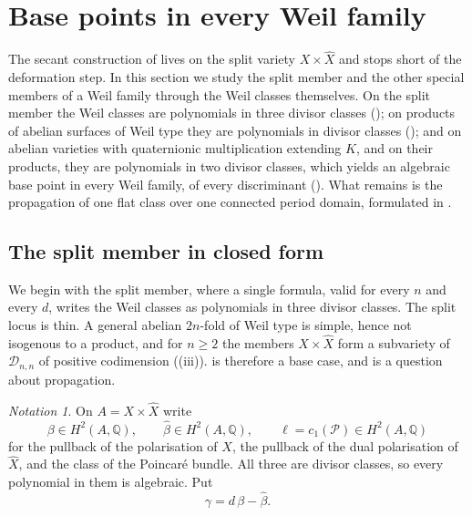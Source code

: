\documentclass[11pt,reqno]{amsart}
\theoremstyle{plain}
\theoremstyle{definition}
\theoremstyle{remark}
\newtheorem{notation}[theorem]{Notation}
\newcommand{\QQ}{\mathbb{Q}}
\newcommand{\cP}{\mathcal{P}}
\newcommand{\cD}{\mathcal{D}}
\begin{document}
\section{Base points in every Weil family}\label{sec:basepoints}

The secant construction of  lives on the split variety
$X\times\widehat{X}$ and stops short of the deformation step. In this section
we study the split member and the other special members of a Weil family
through the Weil classes themselves. On the split member the Weil classes are
polynomials in three divisor classes (); on products of
abelian surfaces of Weil type they are polynomials in divisor classes
(); and on abelian varieties with quaternionic
multiplication extending $K$, and on their products, they are polynomials in
two divisor classes, which yields an algebraic base point in every Weil
family, of every discriminant (). What remains is the
propagation of one flat class over one connected period domain, formulated
in .

\subsection{The split member in closed form}\label{ssec:split}

We begin with the split member, where a single formula, valid for every $n$
and every $d$, writes the Weil classes as polynomials in three divisor
classes. The split locus is thin. A general abelian $2n$-fold
of Weil type is simple, hence not isogenous to a product, and for $n\ge2$ the
members $X\times\widehat{X}$ form a subvariety of $\cD_{n,n}$ of positive
codimension ((iii)).  is
therefore a base case, and  is a question about propagation.

\begin{notation}\label{not:threeclasses}
On $A=X\times\widehat{X}$ write
\[
  \beta\in H^{2}(A,\QQ),
  \qquad
  \widehat{\beta}\in H^{2}(A,\QQ),
  \qquad
  \ell=c_{1}(\cP)\in H^{2}(A,\QQ)
\]
for the pullback of the polarisation of $X$, the pullback of the dual
polarisation of $\widehat{X}$, and the class of the Poincar\'e bundle. All
three are divisor classes, so every polynomial in them is algebraic. Put
\begin{equation}\label{eq:gammadef}
  \gamma=d\,\beta-\widehat{\beta}.
\end{equation}
\end{notation}
\end{document}
